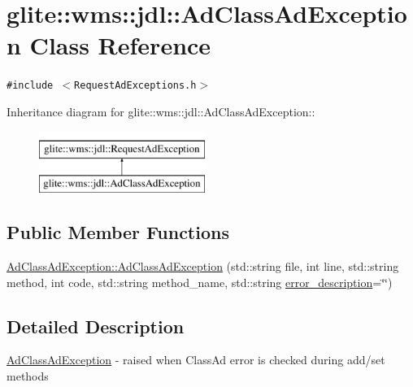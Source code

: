 \hypertarget{classglite_1_1wms_1_1jdl_1_1AdClassAdException}{
\section{glite::wms::jdl::Ad\-Class\-Ad\-Exception Class Reference}
\label{classglite_1_1wms_1_1jdl_1_1AdClassAdException}
}
{\tt \#include $<$Request\-Ad\-Exceptions.h$>$}

Inheritance diagram for glite::wms::jdl::Ad\-Class\-Ad\-Exception::\begin{figure}[H]
\begin{center}
\leavevmode
\includegraphics[height=2cm]{classglite_1_1wms_1_1jdl_1_1AdClassAdException}
\end{center}
\end{figure}
\subsection*{Public Member Functions}
\begin{CompactItemize}
\item 
\hyperlink{classglite_1_1wms_1_1jdl_1_1AdClassAdException_a0}{Ad\-Class\-Ad\-Exception::Ad\-Class\-Ad\-Exception} (std::string file, int line, std::string method, int code, std::string method\_\-name, std::string \hyperlink{classglite_1_1wms_1_1jdl_1_1RequestAdException_p0}{error\_\-description}=\char`\"{}\char`\"{})
\end{CompactItemize}


\subsection{Detailed Description}
\hyperlink{classglite_1_1wms_1_1jdl_1_1AdClassAdException}{Ad\-Class\-Ad\-Exception} - raised when Class\-Ad error is checked during add/set methods 



